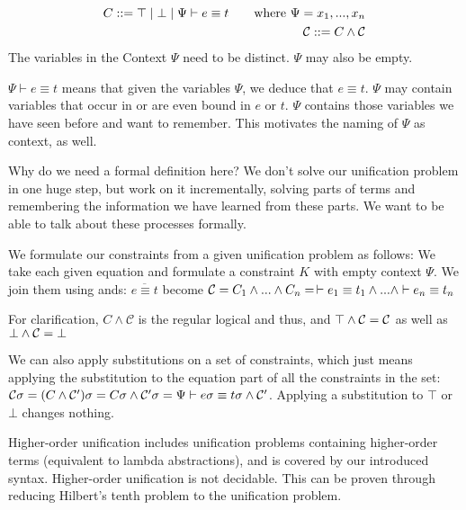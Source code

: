\documentclass[twoside,12pt,a4paper]{article}
\begin{document}
\begin{definition}[Constraint]
    \begin{align*}
        C ::= \top \;|\; \bot \;|\; \Psi \vdash e\equiv t \tag*{where $\Psi = x_1, ..., x_n$}\\
        \mathcal{C} ::= C \wedge \mathcal{C}
    \end{align*}
    The variables in the Context $\Psi$ need to be distinct. $\Psi$ may also be empty.
\end{definition}
$\Psi \vdash e\equiv t$ means that given the variables $\Psi$, we deduce that $e\equiv t$.
$\Psi$ may contain variables that occur in or are even bound in $e$ or $t$. 
$\Psi$ contains those variables we have seen before and want to remember. This motivates the naming of $\Psi$ as context, as well.

Why do we need a formal definition here? We don't solve our unification problem in one huge step, but
work on it incrementally, solving parts of terms and remembering the information we have learned from these parts.
We want to be able to talk about these processes formally.

We formulate our constraints from a given unification problem as follows:
We take each given equation and formulate a constraint $K$ with empty context $\Psi$. We join them using ands: %
$\overline{e\equiv t}$ become $\mathcal{C} = C_1 \wedge ... \wedge C_n = \, \vdash e_1 \equiv t_1 \wedge ...\wedge \vdash e_n \equiv t_n $  

For clarification, $C \wedge \mathcal{C}$ is the regular logical and thus, 
and $\top \wedge \mathcal{C} = \mathcal{C}$ as well as $\bot \wedge \mathcal{C} = \bot$

We can also apply substitutions on a set of constraints, which just means applying the substitution to the equation part of all the constraints in the set:
$\mathcal{C} \sigma = (C \wedge \mathcal{C}')\sigma = C \sigma \wedge \mathcal{C}' \sigma  
= \Psi \vdash e\sigma\equiv t\sigma\wedge \mathcal{C}'$. Applying a substitution to $\top$ or $\bot$ changes nothing.

\begin{theorem}
    Higher-order unification includes unification problems containing higher-order terms (equivalent to lambda abstractions),
    and is covered by our introduced syntax. %
    Higher-order unification is not decidable. This can be proven through reducing Hilbert's tenth problem to the unification problem.
\end{theorem}
\end{document}
